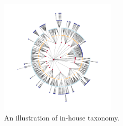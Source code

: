 

\begin{figure}
\label{fig:taxonomy}
\includegraphics[width=0.5\textwidth]{resources/circular_tree.pdf}
\caption{An illustration of in-house taxonomy.}
\end{figure}

